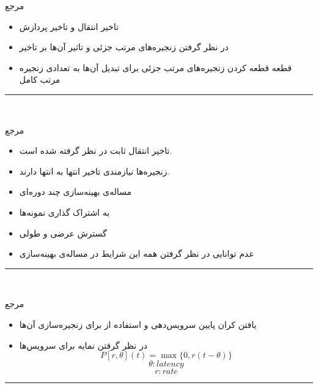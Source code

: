 \documentclass[dvipsnames]{beamer}
\makeatletter
\newcommand{\RTList}{\raggedleft\rightskip\@totalleftmargin}
\makeatother
\begin{document}
\begin{persian}
	\begin{frame}{مرجع~\cite{Yang2019}}
		\begin{itemize}\RTList{}
				\justifying%
				\item تاخیر انتقال و تاخیر پردازش
				\item در نظر گرفتن زنجیره‌های مرتب جزئی و تاثیر آن‌ها بر تاخیر
				\item قطعه قطعه کردن زنجیره‌های مرتب جزئی برای تبدیل آن‌ها به تعدادی زنجیره مرتب کامل
		\end{itemize}
		\begin{latin}
		\noindent\rule{1cm}{0.4pt}\\
		\scriptsize{}
		\end{latin}
	\end{frame}

	\begin{frame}{مرجع~\cite{Huang2019}}
		\begin{itemize}\RTList{}
				\justifying%
				\item تاخیر انتقال ثابت در نظر گرفته شده است.
				\item زنجیره‌ها نیازمندی تاخیر انتها به انتها دارند.
		  		\item مساله‌ی بهینه‌سازی چند دوره‌ای
				\item به اشتراک گذاری نمونه‌ها
				\item گسترش عرضی و طولی
				\item عدم توانایی در نظر گرفتن همه این شرایط در مساله‌ی بهینه‌سازی
		\end{itemize}
		\begin{latin}
		\noindent\rule{1cm}{0.4pt}\\
		\scriptsize{}
		\end{latin}
	\end{frame}

	\begin{frame}{مرجع~\cite{Duan2018}}
		\begin{itemize}\RTList{}
				\justifying%
				\item یافتن کران پایین سرویس‌دهی و استفاده از  برای زنجیره‌سازی آن‌ها
				\item در نظر گرفتن نمایه  برای سرویس‌ها
				\[ P[r, \theta](t) = \max\{0, r(t - \theta)\} \]
				\[ \theta: latency \]
				\[ r: rate \]
		\end{itemize}
		\begin{latin}
		\noindent\rule{1cm}{0.4pt}\\
		\scriptsize{}
		\end{latin}
	\end{frame}


\end{persian}
\end{document}
